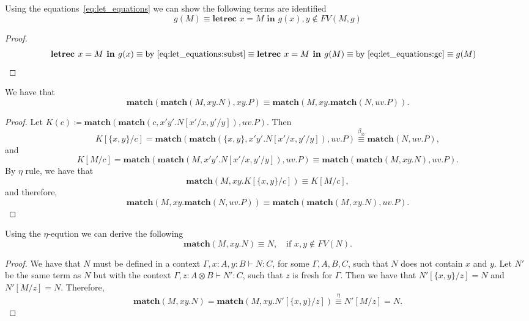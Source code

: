 \begin{example}
\begin{lemma}\label{lemma:letrec}
Using the equations~\cref{eq:let_equations} we can show the following terms are identified
\[
g(M) \equiv \textbf{letrec } x = M \textbf{ in } g(x), y \not \in FV(M,g)
\]
\end{lemma}
\begin{proof}
\begin{align*}
\textbf{letrec } x = M \textbf{ in } g(x) &\equiv \text{by~\cref{eq:let_equations:subst}} \equiv \textbf{letrec } x = M \textbf{ in } g(M) \equiv \text{by~\cref{eq:let_equations:gc}} \equiv g(M)
\end{align*}
\end{proof}

\begin{lemma}\label{lemma:match-comm}
  We have that
  \[
 \textbf{match}(\textbf{match}(M, xy.N), xy.P) \equiv \textbf{match}(M, xy.\textbf{match}(N, uv.P)).
  \]
\end{lemma}
\begin{proof}
Let $K(c) \coloneqq \textbf{match}(\textbf{match}(c, x'y'.N[x'/x, y'/y]), uv.P)$.
Then
\[
K[\{x,y\}/c] = \textbf{match}(\textbf{match}(\{x,y\}, x'y'.N[x'/x,y'/y]), uv.P) \stackrel{\beta_\otimes}{\equiv} \textbf{match}(N, uv.P),
\]
and
\[
K[M/c] = \textbf{match}(\textbf{match}(M, x'y'.N[x'/x,y'/y]), uv.P) \equiv \textbf{match}(\textbf{match}(M, xy.N), uv.P).
\]
By $\eta$ rule, we have that
\[
\textbf{match}(M, xy.K[\{x,y\}/c]) \equiv K[M/c],
\]
and therefore,
\[
\textbf{match}(M, xy.\textbf{match}(N, uv.P)) \equiv \textbf{match}(\textbf{match}(M, xy.N), uv.P).
\]
\end{proof}
\begin{proposition}
\begin{lemma}\label{lemma:match-gc}
Using the $\eta$-eqution we can derive the following
\[
\textbf{match}(M, xy.N) \equiv N, \quad \text{if } x,y \not \in FV(N).
\]
\end{lemma}
\begin{proof}
We have that $N$ must be defined in a context $\Gamma, x : A, y : B \vdash N : C$, for some $\Gamma, A, B, C$, such that $N$ does not contain $x$ and $y$.
Let $N'$ be the same term as $N$ but with the context $\Gamma, z : A \otimes B \vdash N' : C$, such that $z$ is fresh for $\Gamma$.
Then we have that $N'[\{x,y\}/z] = N$ and $N'[M/z] = N$.
Therefore,
\[
\textbf{match}(M, xy.N) = \textbf{match}(M, xy.N'[\{x,y\}/z]) \stackrel{\eta}{\equiv} N'[M/z] = N.
\]
\end{proof}


\end{proposition}
\end{example}
